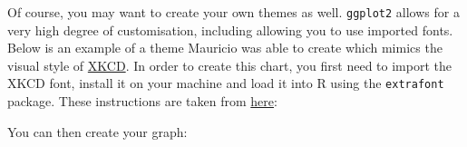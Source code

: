 Of course, you may want to create your own themes as well.
\texttt{ggplot2} allows for a very high degree of customisation,
including allowing you to use imported fonts. Below is an example of a
theme Mauricio was able to create which mimics the visual style of
\href{http://xkcd.com/}{XKCD}. In order to create this chart, you first
need to import the XKCD font, install it on your machine and load it
into R using the \texttt{extrafont} package. These instructions are
taken from
\href{https://www.google.com.au/url?sa=t\&rct=j\&q=\&esrc=s\&source=web\&cd=1\&ved=0ahUKEwiWzafchdPJAhVBpJQKHe_LDT8QFggbMAA\&url=https\%3A\%2F\%2Fcran.r-project.org\%2Fweb\%2Fpackages\%2Fxkcd\%2Fvignettes\%2Fxkcd-intro.pdf\&usg=AFQjCNE-KciGY14e-Q1buYIVmTFC0ht__Q\&sig2=DZUwkvIHwfNWtTtkcz94jg}{here}:

\begin{Shaded}
\begin{Highlighting}[]

\NormalTok{(}\NormalTok{, }\NormalTok{, }
	\NormalTok{)}
\NormalTok{(}\NormalTok{)}
\NormalTok{(}\NormalTok{)}
\NormalTok{(} \NormalTok{, }\NormalTok{)}
\NormalTok{()}
\NormalTok{()}
\end{Highlighting}
\end{Shaded}

You can then create your graph:

